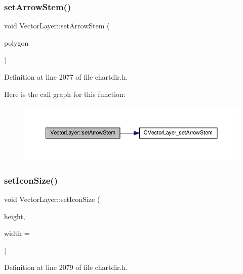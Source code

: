 \subsubsection{\texorpdfstring{set\+Arrow\+Stem()}{setArrowStem()}}
{\footnotesize\ttfamily void Vector\+Layer\+::set\+Arrow\+Stem (\begin{DoxyParamCaption}\item[{\hyperlink{class_int_array}{Int\+Array}}]{polygon }\end{DoxyParamCaption})\hspace{0.3cm}{\ttfamily [inline]}}



Definition at line 2077 of file chartdir.\+h.

Here is the call graph for this function\+:
\nopagebreak
\begin{figure}[H]
\begin{center}
\leavevmode
\includegraphics[width=350pt]{class_vector_layer_a776738058950abe1f23bc38c192b5553_cgraph}
\end{center}
\end{figure}
\mbox{\label{class_vector_layer_a8f1d79e2e95a55949b4b4b5941f44079}} 
\subsubsection{\texorpdfstring{set\+Icon\+Size()}{setIconSize()}}
{\footnotesize\ttfamily void Vector\+Layer\+::set\+Icon\+Size (\begin{DoxyParamCaption}\item[{int}]{height,  }\item[{int}]{width = {} }\end{DoxyParamCaption})\hspace{0.3cm}{\ttfamily [inline]}}



Definition at line 2079 of file chartdir.\+h.

